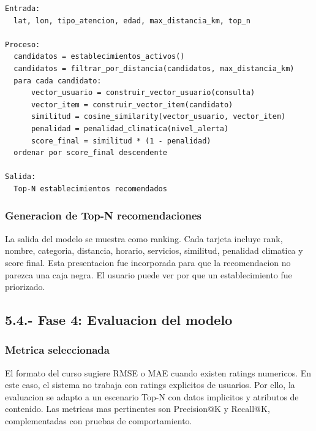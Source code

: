 \documentclass[12pt,a4paper]{article}
\begin{document}
\begin{lstlisting}[caption={Resumen del pipeline de recomendacion implementado.},label={lst:pipeline}]
Entrada:
  lat, lon, tipo_atencion, edad, max_distancia_km, top_n

Proceso:
  candidatos = establecimientos_activos()
  candidatos = filtrar_por_distancia(candidatos, max_distancia_km)
  para cada candidato:
      vector_usuario = construir_vector_usuario(consulta)
      vector_item = construir_vector_item(candidato)
      similitud = cosine_similarity(vector_usuario, vector_item)
      penalidad = penalidad_climatica(nivel_alerta)
      score_final = similitud * (1 - penalidad)
  ordenar por score_final descendente

Salida:
  Top-N establecimientos recomendados
\end{lstlisting}

\subsubsection{Generacion de Top-N recomendaciones}
La salida del modelo se muestra como ranking. Cada tarjeta incluye rank, nombre, categoria, distancia, horario, servicios, similitud, penalidad climatica y score final. Esta presentacion fue incorporada para que la recomendacion no parezca una caja negra. El usuario puede ver por que un establecimiento fue priorizado.

\subsection{5.4.- Fase 4: Evaluacion del modelo}
\subsubsection{Metrica seleccionada}
El formato del curso sugiere RMSE o MAE cuando existen ratings numericos. En este caso, el sistema no trabaja con ratings explicitos de usuarios. Por ello, la evaluacion se adapto a un escenario Top-N con datos implicitos y atributos de contenido. Las metricas mas pertinentes son Precision@K y Recall@K, complementadas con pruebas de comportamiento.
\end{document}
